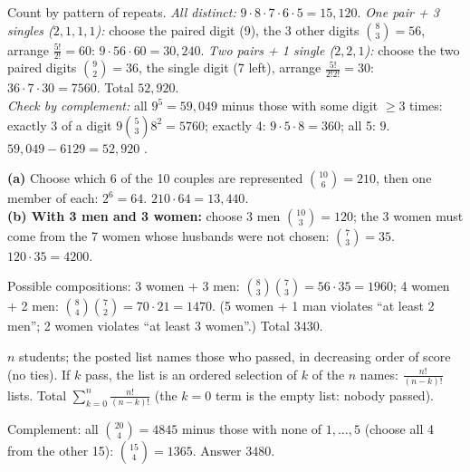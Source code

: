 \documentclass[11pt]{article}
\begin{document}
\begin{exbox}
Count by pattern of repeats. \emph{All distinct:} $9\cdot8\cdot7\cdot6\cdot5=15{,}120$. \emph{One pair + 3 singles ($2,1,1,1$):} choose the paired digit (9), the 3 other digits $\binom83=56$, arrange $\frac{5!}{2!}=60$: $9\cdot56\cdot60=30{,}240$. \emph{Two pairs + 1 single ($2,2,1$):} choose the two paired digits $\binom92=36$, the single digit (7 left), arrange $\frac{5!}{2!2!}=30$: $36\cdot7\cdot30=7560$. Total $\boxed{52{,}920}$.\\
\emph{Check by complement:} all $9^5=59{,}049$ minus those with some digit $\ge3$ times: exactly 3 of a digit $9\binom53 8^2=5760$; exactly 4: $9\cdot5\cdot8=360$; all 5: $9$. $59{,}049-6129=52{,}920$ \checkmark.
\end{exbox}

\begin{exbox}
\textbf{(a)} Choose which 6 of the 10 couples are represented $\binom{10}6=210$, then one member of each: $2^6=64$. $210\cdot64=\boxed{13{,}440}$.\\
\textbf{(b) With 3 men and 3 women:} choose 3 men $\binom{10}3=120$; the 3 women must come from the 7 women whose husbands were not chosen: $\binom73=35$. $120\cdot35=\boxed{4200}$.
\end{exbox}

\begin{exbox}
Possible compositions: 3 women + 3 men: $\binom83\binom73=56\cdot35=1960$; 4 women + 2 men: $\binom84\binom72=70\cdot21=1470$. (5 women + 1 man violates ``at least 2 men''; 2 women violates ``at least 3 women''.) Total $\boxed{3430}$.
\end{exbox}

\begin{exbox}
$n$ students; the posted list names those who passed, in decreasing order of score (no ties). If $k$ pass, the list is an ordered selection of $k$ of the $n$ names: $\frac{n!}{(n-k)!}$ lists. Total $\displaystyle\boxed{\sum_{k=0}^n\frac{n!}{(n-k)!}}$ (the $k=0$ term is the empty list: nobody passed).
\end{exbox}

\begin{exbox}
Complement: all $\binom{20}4=4845$ minus those with none of $1,\dots,5$ (choose all 4 from the other 15): $\binom{15}4=1365$. Answer $\boxed{3480}$.
\end{exbox}
\end{document}
